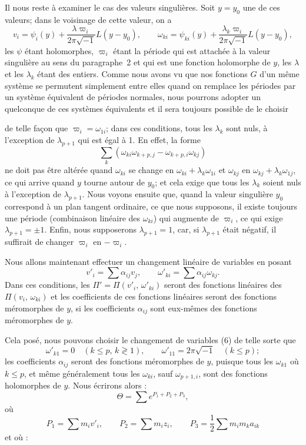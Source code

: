 \documentclass{article}
\begin{document}
Il nous reste à examiner le cas des valeurs singulières. Soit $y = y_{0}$ une de ces valeurs; dans le voisinage de cette valeur, on a
\[
v_{i} = \psi_{i}(y) + \frac{\lambda \varpi_{i}}{2\pi\sqrt{-1}} L(y - y_{0}), \qquad \omega_{ki} = \psi_{ki}(y) + \frac{\lambda_{k} \varpi_{i}}{2\pi\sqrt{-1}} L(y - y_{0}),
\]
les $\psi$ étant holomorphes, $\varpi_{i}$ étant la période qui est attachée à la valeur singulière au sens du paragraphe~2 et qui est une fonction holomorphe de $y$, les $\lambda$ et les $\lambda_{k}$ étant des entiers. Comme nous avons vu que nos fonctions $G$ d'un même système se permutent simplement entre elles quand on remplace les périodes par un système équivalent de périodes normales, nous pourrons adopter un quelconque de ces systèmes équivalents et il sera toujours possible de le choisir

de telle façon que $\varpi_{i} = \omega_{1i}$; dans ces conditions, tous les $\lambda_{k}$ sont nuls, à l'exception de $\lambda_{p+1}$ qui est égal à 1. En effet, la forme
\[
\sum_{k} (\omega_{ki} \omega_{k+p, j} - \omega_{k+p, i} \omega_{kj})
\]
ne doit pas être altérée quand $\omega_{ki}$ se change en $\omega_{ki} + \lambda_{k} \omega_{1i}$ et $\omega_{kj}$ en $\omega_{kj} + \lambda_{k} \omega_{1j}$, ce qui arrive quand $y$ tourne autour de $y_{0}$; et cela exige que tous les $\lambda_{k}$ soient nuls à l'exception de $\lambda_{p+1}$. Nous voyons ensuite que, quand la valeur singulière $y_{0}$ correspond à un plan tangent ordinaire, ce que nous supposons, il existe toujours une période (combinaison linéaire des $\omega_{ki}$) qui augmente de $\varpi_{i}$, ce qui exige $\lambda_{p+1} = \pm 1$. Enfin, nous supposerons $\lambda_{p+1} = 1$, car, si $\lambda_{p+1}$ était négatif, il suffirait de changer $\varpi_{i}$ en $-\varpi_{i}$.

Nous allons maintenant effectuer un changement linéaire de variables en posant
\[
v'_{i} = \sum \alpha_{ij} v_{j}, \qquad \omega'_{ki} = \sum \alpha_{ij} \omega_{kj}. \tag{6}
\]
Dans ces conditions, les $\Pi' = \Pi(v'_{i},\, \omega'_{ki})$ seront des fonctions linéaires des $\Pi(v_{i},\, \omega_{ki})$ et les coefficients de ces fonctions linéaires seront des fonctions méromorphes de $y$, si les coefficients $\alpha_{ij}$ sont eux-mêmes des fonctions méromorphes de $y$.

Cela posé, nous pouvons choisir le changement de variables (6) de telle sorte que
\[
\omega'_{k1} = 0 \quad (k \le p,\, k \gtrless 1), \qquad \omega'_{11} = 2\pi\sqrt{-1} \quad (k \le p);
\]
les coefficients $\alpha_{ij}$ seront des fonctions méromorphes de $y$, puisque tous les $\omega_{k1}$ où $k \le p$, et même généralement tous les $\omega_{ki}$, sauf $\omega_{p+1, i}$, sont des fonctions holomorphes de $y$. Nous écrirons alors :
\[
\Theta = \sum e^{P_{1} + P_{2} + P_{3}},
\]
où
\[
P_{1} = \sum m_{i} v'_{i}, \qquad P_{2} = \sum m_{i} z_{i}, \qquad P_{3} = \frac{1}{2} \sum m_{i} m_{k} a_{ik}
\]
et où :
\end{document}
